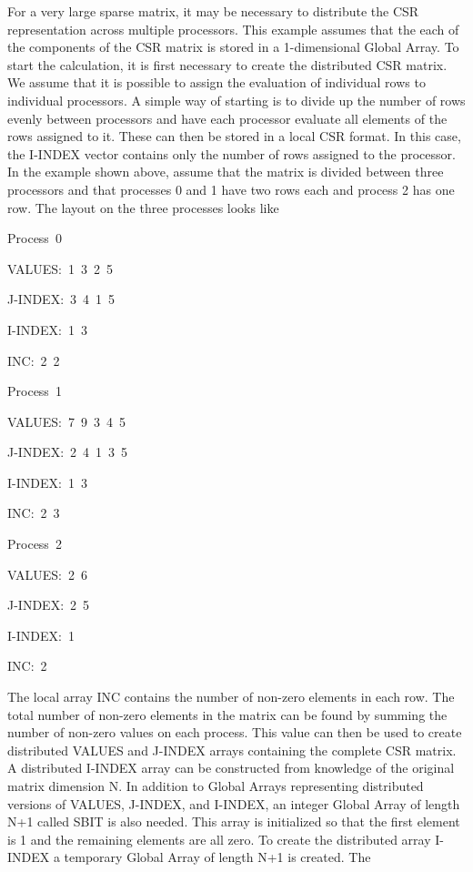 For a very large sparse matrix, it may be necessary to distribute
the CSR representation across multiple processors. This example assumes
that the each of the components of the CSR matrix is stored in a 1-dimensional
Global Array. To start the calculation, it is first necessary to create
the distributed CSR matrix. We assume that it is possible to assign
the evaluation of individual rows to individual processors. A simple
way of starting is to divide up the number of rows evenly between
processors and have each processor evaluate all elements of the rows
assigned to it. These can then be stored in a local CSR format. In
this case, the I-INDEX vector contains only the number of rows assigned
to the processor. In the example shown above, assume that the matrix
is divided between three processors and that processes 0 and 1 have
two rows each and process 2 has one row. The layout on the three processes
looks like
\begin{lyxcode}
Process~0~

VALUES:~1~3~2~5~

J-INDEX:~3~4~1~5~

I-INDEX:~1~3~

INC:~2~2



Process~1~

VALUES:~7~9~3~4~5~

J-INDEX:~2~4~1~3~5~

I-INDEX:~1~3~

INC:~2~3



Process~2~

VALUES:~2~6~

J-INDEX:~2~5~

I-INDEX:~1~

INC:~2~
\end{lyxcode}
The local array INC contains the number of non-zero elements in each
row. The total number of non-zero elements in the matrix can be found
by summing the number of non-zero values on each process. This value
can then be used to create distributed VALUES and J-INDEX arrays containing
the complete CSR matrix. A distributed I-INDEX array can be constructed
from knowledge of the original matrix dimension N. In addition to
Global Arrays representing distributed versions of VALUES, J-INDEX,
and I-INDEX, an integer Global Array of length N+1 called SBIT is
also needed. This array is initialized so that the first element is
1 and the remaining elements are all zero. To create the distributed
array I-INDEX a temporary Global Array of length N+1 is created. The
